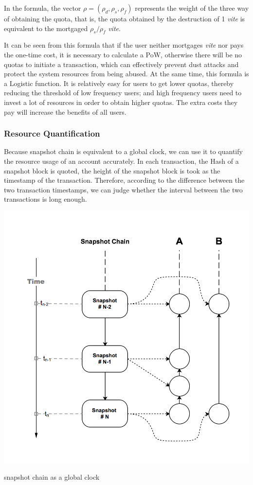 \documentclass[UTF8,nofonts]{article}
\makeatletter
\newenvironment{figurehere}
 {\def\@captype{figure}}
 {}
\makeatother
\begin{document}
\begin{multicols}{2}
In the formula, the vector $\rho=(\rho_{d}, \rho_{s}, \rho_{f})$ represents the weight of the three way of obtaining the quota, that is, the quota obtained by the destruction of 1 \: \textit{vite} is equivalent to the mortgaged $\rho_{s} / \rho_{f}$ \: \textit{vite}.

It can be seen from this formula that if the user neither mortgages \textit{vite} nor pays the one-time cost, it is necessary to calculate a PoW, otherwise there will be no quotas to initiate a transaction, which can effectively prevent dust attacks and protect the system resources from being abused. At the same time, this formula is a Logistic function. It is relatively easy for users to get lower quotas, thereby reducing the threshold of low frequency users; and high frequency users need to invest a lot of resources in order to obtain higher quotas. The extra costs they pay will increase the benefits of all users.

\subsubsection{Resource Quantification}
Because snapshot chain is equivalent to a global clock, we can use it to quantify the resource usage of an account accurately. In each transaction, the Hash of a snapshot block is quoted, the height of the snapshot block is took as the timestamp of the transaction. Therefore, according to the difference between the two transaction timestamps, we can judge whether the interval between the two transactions is long enough.

\begin{center}
\begin{figurehere}
\includegraphics[width=.8\linewidth]{image/snapshotchain-clock.png}
\caption{snapshot chain as a global clock}
\end{figurehere}
\end{center}


\end{multicols}
\end{document}
